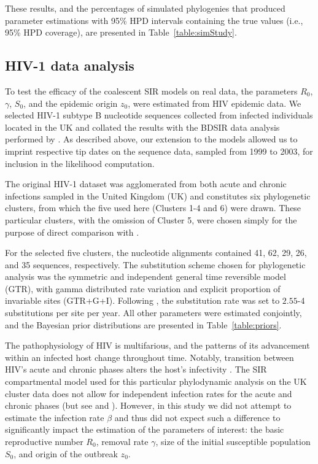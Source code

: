 \documentclass[12pt,titlepage]{article}
\newcommand{\BDSIR}{BDSIR}
\begin{document}
These results, and the percentages of simulated phylogenies that produced 
parameter estimations with 95\% HPD intervals containing the true values (i.e., 95\% HPD coverage), are presented in 
Table~\ref{table:simStudy}.

\subsection{HIV-1 data analysis}

To test the efficacy of the coalescent SIR models on real data, the parameters $R_0$, 
$\gamma$, $S_0$, and the epidemic origin $z_{0}$, were estimated from HIV epidemic data.  
We selected HIV-1 subtype B nucleotide sequences collected from infected individuals located 
in the UK and collated the results with the \BDSIR{} data analysis performed by \cite{Kuhnert:2014}.  As described above, our extension to the 
models allowed us to imprint respective tip dates on the sequence data, sampled from 1999 
to 2003, for inclusion in the likelihood computation.

The original HIV-1 dataset \citep{Hue:2005} was agglomerated from both acute and chronic 
infections sampled in the United Kingdom (UK) and constitutes six phylogenetic clusters, 
from which the five used here (Clusters 1-4 and 6) were drawn.  These particular clusters, with the omission of Cluster 5, were chosen simply 
for the purpose of direct comparison with \cite{Kuhnert:2014}.  

For the selected five clusters, the nucleotide alignments 
contained 41, 62, 29, 26, and 35 sequences, respectively.  The substitution scheme 
chosen for phylogenetic analysis was the symmetric and independent general time reversible 
model (GTR), with gamma distributed rate variation and explicit proportion of invariable sites (GTR+G+I).  Following \cite{Hue:2005}, the substitution rate 
was set to $\num{2.55}$\mbox{-4} substitutions per site per year.  All other parameters were estimated conjointly, 
and the Bayesian prior distributions are presented in Table~\ref{table:priors}.

The pathophysiology of HIV is multifarious, and the patterns of its advancement within an 
infected host change throughout time.  Notably, transition between HIV's acute and 
chronic phases alters the host's infectivity \citep{Guss:1994}.  The SIR compartmental 
model used for this particular phylodynamic analysis on the UK cluster data does not 
allow for independent infection rates for the acute and chronic phases (but see \cite{VolzFrost:2012} and \cite{Volz:2013}).   However, 
in this study we did not attempt to estimate the infection rate $\beta$ and thus did not 
expect such a difference to significantly impact the estimation of the parameters of 
interest:  the basic reproductive number $R_0$, removal rate $\gamma$, size of the initial susceptible population 
$S_{0}$, and origin of the outbreak $z_{0}$.
\end{document}
